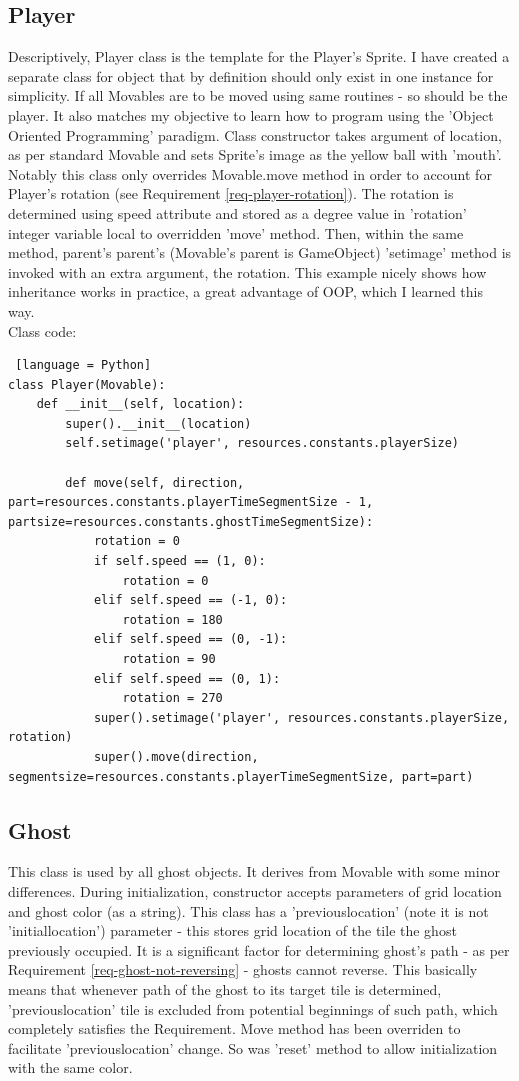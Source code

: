 \documentclass[11pt,a4paper]{report}
\newcommand{\dsubsection}[1]{\FloatBarrier \subsection{#1}}
\begin{document}
			\dsubsection{Player}
				Descriptively, Player class is the template for the Player's Sprite. I have created a separate class for object that by definition should only exist in one instance for simplicity. If all Movables are to be moved using same routines - so should be the player. It also matches my objective to learn how to program using the 'Object Oriented Programming' paradigm. 
				Class constructor takes argument of location, as per standard Movable and sets Sprite's image as the yellow ball with 'mouth'.
				Notably this class only overrides Movable.move method in order to account for Player's rotation (see Requirement \ref{req-player-rotation}). The rotation is determined using speed attribute and stored as a degree value in 'rotation' integer variable local to overridden 'move' method. Then, within the same method, parent's parent's (Movable's parent is GameObject) 'setimage' method is invoked with an extra argument, the rotation. This example nicely shows how inheritance works in practice, a great advantage of OOP, which I learned this way.\\
				Class code:
				\begin{lstlisting} [language = Python]
class Player(Movable):
	def __init__(self, location):
		super().__init__(location)
		self.setimage('player', resources.constants.playerSize)
		
		def move(self, direction, part=resources.constants.playerTimeSegmentSize - 1, partsize=resources.constants.ghostTimeSegmentSize):
			rotation = 0
			if self.speed == (1, 0):
				rotation = 0
			elif self.speed == (-1, 0):
				rotation = 180
			elif self.speed == (0, -1):
				rotation = 90
			elif self.speed == (0, 1):
				rotation = 270
			super().setimage('player', resources.constants.playerSize, rotation)
			super().move(direction, segmentsize=resources.constants.playerTimeSegmentSize, part=part)
				\end{lstlisting}
			\dsubsection{Ghost}
				This class is used by all ghost objects. It derives from Movable with some minor differences. 
				During initialization, constructor accepts parameters of grid location and ghost color (as a string).
				This class has a 'previouslocation' (note it is not 'initiallocation') parameter - this stores grid location of the tile the ghost previously occupied. It is a significant factor for determining ghost's path - as per Requirement \ref{req-ghost-not-reversing} - ghosts cannot reverse. This basically means that whenever path of the ghost to its target tile is determined, 'previouslocation' tile is excluded from potential beginnings of such path, which completely satisfies the Requirement. Move method has been overriden to facilitate 'previouslocation' change. So was 'reset' method to allow initialization with the same color.
\end{document}
